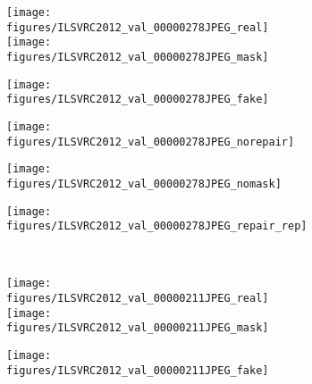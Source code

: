 \documentclass[10pt,twocolumn,letterpaper]{article}
\begin{document}
\begin{figure}[t]
\begin{center}
\begin{subfigure}[h]{0.195\linewidth}
	\texttt{[image: figures/ILSVRC2012\_val\_00000278JPEG\_real]}%
\hspace{-\linewidth}\texttt{[image: figures/ILSVRC2012\_val\_00000278JPEG\_mask]}%
\end{subfigure}\hspace{.4mm}%
\begin{subfigure}[h]{0.195\linewidth}
	\texttt{[image: figures/ILSVRC2012\_val\_00000278JPEG\_fake]}%
\end{subfigure}\hspace{.4mm}%
\begin{subfigure}[h]{0.195\linewidth}
	\texttt{[image: figures/ILSVRC2012\_val\_00000278JPEG\_norepair]}%
\end{subfigure}\hspace{.4mm}%
\begin{subfigure}[h]{0.195\linewidth}
	\texttt{[image: figures/ILSVRC2012\_val\_00000278JPEG\_nomask]}%
\end{subfigure}\hspace{.4mm}%
\begin{subfigure}[h]{0.195\linewidth}
	\texttt{[image: figures/ILSVRC2012\_val\_00000278JPEG\_repair\_rep]}%
\end{subfigure}\\
\begin{subfigure}[h]{0.195\linewidth}
	\texttt{[image: figures/ILSVRC2012\_val\_00000211JPEG\_real]}%
\hspace{-\linewidth}\texttt{[image: figures/ILSVRC2012\_val\_00000211JPEG\_mask]}%
        \caption{}
\end{subfigure}\hspace{.4mm}%
\begin{subfigure}[h]{0.195\linewidth}
	\texttt{[image: figures/ILSVRC2012\_val\_00000211JPEG\_fake]}%
        \caption{}
\end{subfigure}\hspace{.4mm}%
\begin{subfigure}[h]{0.195\linewidth}

\end{subfigure}
\end{center}
\end{figure}
\end{document}
